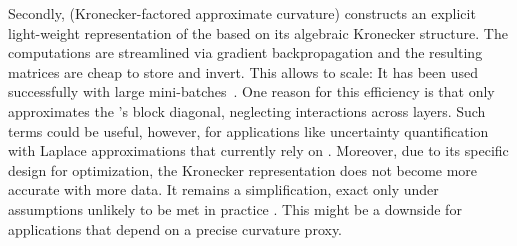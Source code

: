 Secondly, \kfac (Kronecker-factored approximate curvature)
\citep{martens2015optimizing, grosse2016kronecker, botev2017practical,
  martens2018kronecker} constructs an explicit light-weight
representation of the \ggn based on its algebraic Kronecker structure.
The computations are streamlined via gradient backpropagation and the resulting
matrices are cheap to store and invert. This allows \kfac to scale: It has been
used successfully with large mini-batches~\citep{osawa2019large}. One reason for
this efficiency is that \kfac only approximates the \ggn's block diagonal,
neglecting interactions across layers.
Such terms could be useful, however, for applications like uncertainty
quantification with Laplace approximations \citep{ritter2018scalable,
  ritter2018online, kristiadi2020being, daxberger2021laplace} that currently
rely on \kfac. Moreover, due to its specific design for optimization, the
Kronecker representation does not become more accurate with more data. It
remains a simplification, exact only under assumptions unlikely to be met in
practice \citep{martens2015optimizing}. This might be a downside for
applications that depend on a precise curvature proxy.

